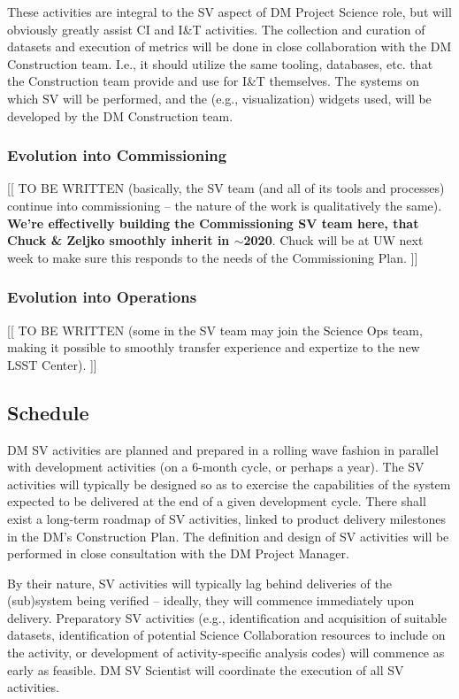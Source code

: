 These activities are integral to the SV aspect of DM Project Science role,
but will obviously greatly assist CI and I\&T activities.  The collection
and curation of datasets and execution of metrics will be done in close
collaboration with the DM Construction team.  I.e., it should utilize the
same tooling, databases, etc.  that the Construction team provide and use
for I\&T themselves.  The systems on which SV will be performed, and the
(e.g., visualization) widgets used, will be developed by the DM
Construction team.

\subsubsection{Evolution into Commissioning}

[[ TO BE WRITTEN (basically, the SV team (and all of its tools and processes) continue
into commissioning -- the nature of the work is qualitatively the same). 
{\bf We're effectivelly building the Commissioning SV team here, that Chuck
\& Zeljko smoothly inherit in $\sim$2020}.  Chuck will be at UW next week to make sure
this responds to the needs of the Commissioning Plan. ]]

\subsubsection{Evolution into Operations}

[[ TO BE WRITTEN (some in the SV team may join the Science Ops team, making it
possible to smoothly transfer experience and expertize to the new LSST
Center). ]]

\subsection{Schedule}

DM SV activities are planned and prepared in a rolling wave fashion in
parallel with development activities (on a 6-month cycle, or perhaps a
year).  The SV activities will typically be designed so as to exercise the
capabilities of the system expected to be delivered at the end of a given
development cycle.  There shall exist a long-term roadmap of SV activities,
linked to product delivery milestones in the DM's Construction Plan.  The
definition and design of SV activities will be performed in close
consultation with the DM Project Manager.

By their nature, SV activities will typically lag behind
deliveries of the (sub)system being verified -- ideally, they will commence
immediately upon delivery. Preparatory SV activities (e.g., identification and
acquisition of suitable datasets, identification of potential Science
Collaboration resources to include on the activity, or development of
activity-specific analysis codes) will commence as early as feasible. DM SV
Scientist will coordinate the execution of all SV activities.

